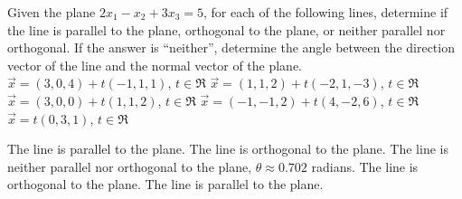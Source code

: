 
\begin{Exercise}[
name={},
title={}, 
difficulty=0,
origin={\cite{SM}}]
Given the plane $2x_1-x_2+3x_3=5$, for each of the following lines, determine if the line is parallel to the plane, orthogonal to the plane, or neither parallel nor orthogonal. If the answer is ``neither'', determine the angle between the direction vector of the line and the normal vector of the plane.
\Question $\vec{x}=(3,0,4)+t(-1,1,1)$, $t\in\Re$
\Question $\vec{x}=(1,1,2)+t(-2,1,-3)$, $t\in\Re$
\Question $\vec{x}=(3,0,0)+t(1,1,2)$, $t\in\Re$
\Question $\vec{x}=(-1,-1,2)+t(4,-2,6)$, $t\in\Re$
\Question $\vec{x}=t(0,3,1)$, $t\in\Re$
\end{Exercise}

\begin{Answer}
\Question The line is parallel to the plane.
\Question The line is orthogonal to the plane.
\Question The line is neither parallel nor orthogonal to the plane, $\theta \approx 0.702$ radians.
\Question The line is orthogonal to the plane.
\Question The line is parallel to the plane.
\end{Answer}

